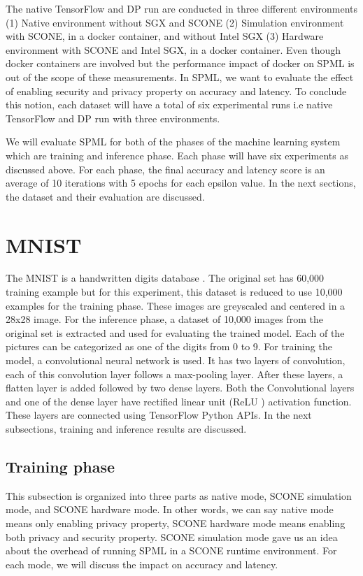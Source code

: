 The native TensorFlow and DP run are conducted in three different environments (1) Native environment without SGX and SCONE (2) Simulation environment with SCONE, in a docker container, and without Intel SGX (3) Hardware environment with SCONE and Intel SGX, in a docker container. Even though docker containers are involved but the performance impact of docker on SPML is out of the scope of these measurements. In SPML, we want to evaluate the effect of enabling security and privacy property on accuracy and latency. To conclude this notion, each dataset will have a total of six experimental runs i.e native TensorFlow and DP run with three environments.

We will evaluate SPML for both of the phases of the machine learning system which are training and inference phase. Each phase will have six experiments as discussed above. For each phase, the final accuracy and latency score is an average of 10 iterations with 5 epochs for each epsilon value. In the next sections, the dataset and their evaluation are discussed.
\section{MNIST}
\label{sec:evalMnist}
The MNIST is a handwritten digits database \cite{12}. The original set has 60,000 training example but for this experiment, this dataset is reduced to use 10,000 examples for the training phase. These images are greyscaled and centered in a 28x28 image. For the inference phase, a dataset of 10,000 images from the original set is extracted and used for evaluating the trained model. Each of the pictures can be categorized as one of the digits from 0 to 9. For training the model, a convolutional neural network is used. It has two layers of convolution, each of this convolution layer follows a max-pooling layer. After these layers, a flatten layer is added followed by two dense layers. Both the Convolutional layers and one of the dense layer have rectified linear unit (ReLU ) activation function. These layers are connected using TensorFlow Python APIs. In the next subsections, training and inference results are discussed. 
\subsection{Training phase}
This subsection is organized into three parts as native mode, SCONE simulation mode, and SCONE hardware mode. In other words, we can say native mode means only enabling privacy property, SCONE hardware mode means enabling both privacy and security property. SCONE simulation mode gave us an idea about the overhead of running SPML in a SCONE runtime environment. For each mode, we will discuss the impact on accuracy and latency.

